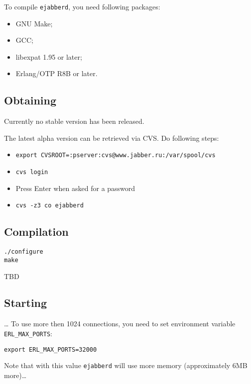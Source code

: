 \documentclass[10pt]{article}
\newcommand{\ejabberd}{\texttt{ejabberd}}
\begin{document}
To compile \ejabberd{}, you need following packages:
\begin{itemize}
\item GNU Make;
\item GCC;
\item libexpat 1.95 or later;
\item Erlang/OTP R8B or later.
\end{itemize}

\subsection{Obtaining}
\label{sec:obtaining}

Currently no stable version has been released.

The latest alpha version can be retrieved via CVS\@.  Do following steps:
\begin{itemize}
\item \texttt{export CVSROOT=:pserver:cvs@www.jabber.ru:/var/spool/cvs}
\item \texttt{cvs login}
\item Press Enter when asked for a password
\item \texttt{cvs -z3 co ejabberd}
\end{itemize}






\subsection{Compilation}
\label{sec:compilation}

\begin{verbatim}
./configure
make
\end{verbatim}

TBD





\subsection{Starting}
\label{sec:starting}

\ldots{} To use more then 1024 connections, you need to set environment
variable \texttt{ERL\_MAX\_PORTS}:
\begin{verbatim}
export ERL_MAX_PORTS=32000
\end{verbatim}
Note that with this value \ejabberd{} will use more memory (approximately 6MB
more)\ldots{}
\end{document}
